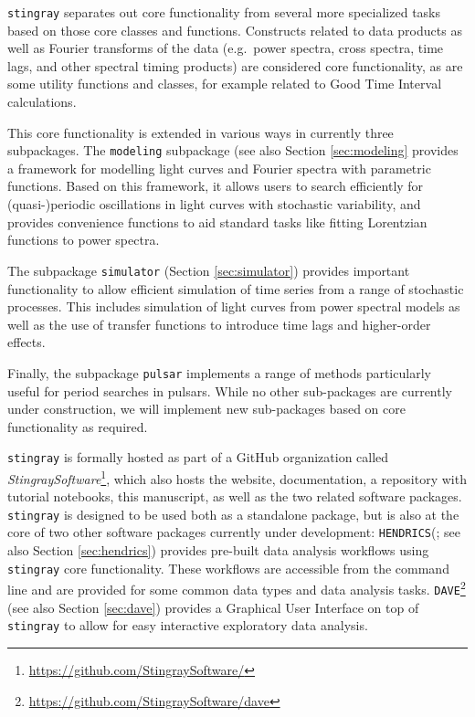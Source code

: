 \documentclass[twocolumn]{aastex62}
\newcommand{\stingray}{\texttt{stingray}\xspace}
\newcommand{\hendrics}{\texttt{HENDRICS}\xspace}
\newcommand{\dave}{\texttt{DAVE}\xspace}
\begin{document}
\stingray separates out core functionality from several more specialized tasks based on those core classes and functions. Constructs related to data products as well as Fourier transforms of the data (e.g.\ power spectra, cross spectra, time lags, and other spectral timing products) are considered core functionality, as are some utility functions and classes, for example related to Good Time Interval calculations. 

This core functionality is extended in various ways in currently three subpackages. The \texttt{modeling} subpackage (see also Section \ref{sec:modeling} provides a framework for modelling light curves and Fourier spectra with parametric functions. Based on this framework, it allows users to search efficiently for (quasi-)periodic oscillations in light curves with stochastic variability, and provides convenience functions to aid standard tasks like fitting Lorentzian functions to power spectra. 

The subpackage \texttt{simulator} (Section \ref{sec:simulator}) provides important functionality to allow efficient simulation of time series from a range of stochastic processes. This includes simulation of light curves from power spectral models as well as the use of transfer functions to introduce time lags and higher-order effects. 

Finally, the subpackage \texttt{pulsar} implements a range of methods particularly useful for period searches in pulsars. While no other sub-packages are currently under construction, we will implement new sub-packages based on core functionality as required. 


\stingray is formally hosted as part of a GitHub organization called \textit{StingraySoftware}\footnote{\url{https://github.com/StingraySoftware/}}, which also hosts the website, documentation, a repository with tutorial notebooks, this manuscript, as well as the two related software packages. \stingray is designed to be used both as a standalone package, but is also at the core of two other software packages currently under development: \hendrics (\citealt{hendrics}; see also Section \ref{sec:hendrics}) provides pre-built data analysis workflows using \stingray core functionality. These workflows are accessible from the command line and are provided for some common data types and data analysis tasks. \dave\footnote{\url{https://github.com/StingraySoftware/dave}} (see also Section \ref{sec:dave}) provides a Graphical User Interface on top of \stingray to allow for easy interactive exploratory data analysis.
 
\end{document}
